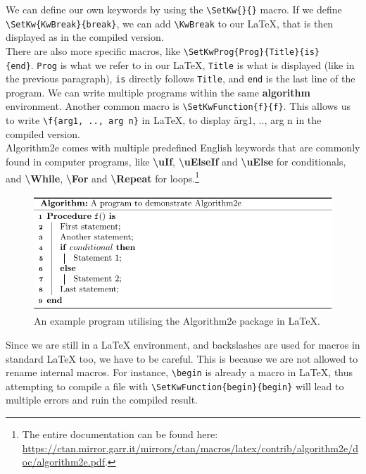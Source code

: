 We can define our own keywords by using the \texttt{\textbackslash SetKw\{\}\{\}} macro. If we define \texttt{\textbackslash SetKw\{KwBreak\}\{break\}}, we can add \texttt{\textbackslash KwBreak} to our LaTeX, that is then displayed as \KwBreak in the compiled version. \\

There are also more specific macros, like \texttt{\textbackslash SetKwProg\{Prog\}\{Title\}\{is\}\\\{end\}}. \texttt{Prog} is what we refer to in our LaTeX, \texttt{Title} is what is displayed (like \KwBreak in the previous paragraph), \texttt{is} directly follows \texttt{Title}, and \texttt{end} is the last line of the program. We can write multiple programs within the same \textbf{algorithm} environment. Another common macro is \texttt{\textbackslash SetKwFunction\{f\}\{f\}}. This allows us to write \texttt{\textbackslash f\{arg1, .., arg n\}} in LaTeX, to display \f{arg1, .., arg n} in the compiled version. \\

Algorithm2e comes with multiple predefined English keywords that are commonly found in computer programs, like \textbf{\textbackslash uIf}, \textbf{\textbackslash uElseIf} and \textbf{\textbackslash uElse} for conditionals, and \textbf{\textbackslash While}, \textbf{\textbackslash For} and \textbf{\textbackslash Repeat} for loops.\footnote{The entire documentation can be found here: \url{https://ctan.mirror.garr.it/mirrors/ctan/macros/latex/contrib/algorithm2e/doc/algorithm2e.pdf}.} \\

\begin{figure}[ht]
    \centering
    \includegraphics[scale=.95]{assets/chapter2/TheFirstAlgorithm2e.pdf}
    \caption{An example program utilising the Algorithm2e package in LaTeX.}
    \label{The first Algorithm2e program.}
\end{figure}

Since we are still in a LaTeX environment, and backslashes are used for macros in standard LaTeX too, we have to be careful. This is because we are not allowed to rename internal macros. For instance, \texttt{\textbackslash begin} is already a macro in LaTeX, thus attempting to compile a file with \texttt{\textbackslash SetKwFunction\{begin\}\{begin\}} will lead to multiple errors and ruin the compiled result. \\

